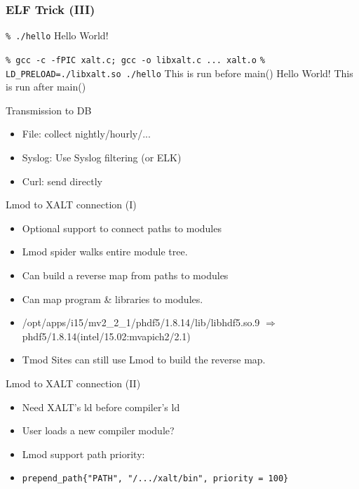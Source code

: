\documentclass{beamer}
\begin{document}
\begin{frame}[fragile]
    \frametitle{ELF Trick (III)}
 {\small
    \begin{semiverbatim}
        \texttt{\% ./hello}
        Hello World!

        \texttt{\% gcc -c -fPIC xalt.c; gcc -o libxalt.c ... xalt.o}
        \texttt{\% LD\_PRELOAD=./libxalt.so ./hello}
        This is run before main()
        Hello World!
        This is run after main()
    \end{semiverbatim}
}
\end{frame}

\begin{frame}{Transmission to DB}
  \begin{itemize}
    \item File: collect nightly/hourly/...
    \item Syslog: Use Syslog filtering (or ELK)
    \item Curl: send directly 
  \end{itemize}
\end{frame}

\begin{frame}{Lmod to XALT connection (I)}
  \begin{itemize}
    \item Optional support to connect paths to modules
    \item Lmod spider walks entire module tree.
    \item Can build a reverse map from paths to modules
    \item Can map program \& libraries to modules.
    \item /opt/apps/i15/mv2\_2\_1/phdf5/1.8.14/lib/libhdf5.so.9
      $\Rightarrow$ phdf5/1.8.14(intel/15.02:mvapich2/2.1)
    \item Tmod Sites can still use Lmod to build the reverse map.
  \end{itemize}
\end{frame}


\begin{frame}{Lmod to XALT connection (II)}
  \begin{itemize}
    \item Need XALT's ld before compiler's ld
    \item User loads a new compiler module?
    \item Lmod support path priority:
    \item \texttt{prepend\_path\{"PATH", "/.../xalt/bin", priority = 100\}}
  \end{itemize}
\end{frame}
\end{document}
